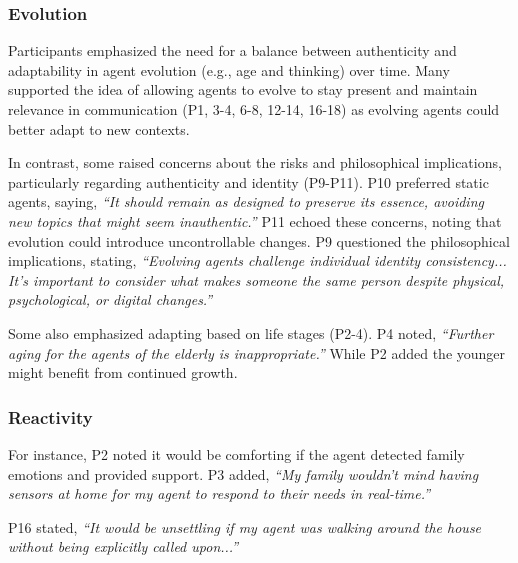 \subsubsection{Evolution} \label{evolution}

Participants emphasized the need for a balance between authenticity and adaptability in agent evolution (e.g., age and thinking) over time. Many supported the idea of allowing agents to evolve to stay present and maintain relevance in communication (P1, 3-4, 6-8, 12-14, 16-18) as evolving agents could better adapt to new contexts. 

In contrast, some raised concerns about the risks and philosophical implications, particularly regarding authenticity and identity (P9-P11). P10 preferred static agents, saying, \textit{``It should remain as designed to preserve its essence, avoiding new topics that might seem inauthentic.''} P11 echoed these concerns, noting that evolution could introduce uncontrollable changes. P9 questioned the philosophical implications, stating, \textit{``Evolving agents challenge individual identity consistency... It's important to consider what makes someone the same person despite physical, psychological, or digital changes.''}

Some also emphasized adapting based on life stages (P2-4). P4 noted, \textit{``Further aging for the agents of the elderly is inappropriate.''} While P2 added the younger might benefit from continued growth.

\subsubsection{Reactivity} \label{reactivity}
For instance, P2 noted it would be comforting if the agent detected family emotions and provided support. P3 added, \textit{``My family wouldn't mind having sensors at home for my agent to respond to their needs in real-time.''}

 P16 stated, \textit{``It would be unsettling if my agent  was walking around the house without being explicitly called upon...''}

